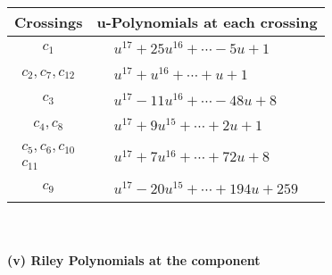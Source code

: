 \documentclass[1p]{elsarticle_modified}
\theoremstyle{definition}
\begin{document}
\begin{tabular}{m{50pt}|m{274pt}}
Crossings & \hspace{64pt}u-Polynomials at each crossing \\
\hline $$\begin{aligned}c_{1}\end{aligned}$$&$\begin{aligned}
&u^{17}+25 u^{16}+\cdots-5 u+1
\end{aligned}$\\
\hline $$\begin{aligned}c_{2},c_{7},c_{12}\end{aligned}$$&$\begin{aligned}
&u^{17}+u^{16}+\cdots+u+1
\end{aligned}$\\
\hline $$\begin{aligned}c_{3}\end{aligned}$$&$\begin{aligned}
&u^{17}-11 u^{16}+\cdots-48 u+8
\end{aligned}$\\
\hline $$\begin{aligned}c_{4},c_{8}\end{aligned}$$&$\begin{aligned}
&u^{17}+9 u^{15}+\cdots+2 u+1
\end{aligned}$\\
\hline $$\begin{aligned}c_{5},c_{6},c_{10}\\c_{11}\end{aligned}$$&$\begin{aligned}
&u^{17}+7 u^{16}+\cdots+72 u+8
\end{aligned}$\\
\hline $$\begin{aligned}c_{9}\end{aligned}$$&$\begin{aligned}
&u^{17}-20 u^{15}+\cdots+194 u+259
\end{aligned}$\\
\hline
\end{tabular}\\~\\
\newpage\renewcommand{\arraystretch}{1}
\flushleft \textbf{(v) Riley Polynomials at the component}\newline \\
\end{document}
